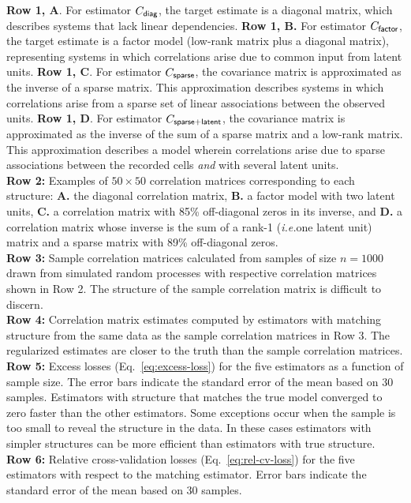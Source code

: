 \documentclass[10pt]{article}
\newcommand{\ie}{\emph{i.e.}\;}
\begin{document}
\begin{FPfigure}
{        {\bf Row 1, A}.  For estimator $C_{\sf diag}$, the target estimate is a diagonal matrix, which describes systems that lack linear dependencies. 
        {\bf  Row 1, B.} For estimator $C_{\sf factor}$, the target estimate is a factor model (low-rank matrix plus a diagonal matrix), representing systems in which correlations arise due to common input from latent units. 
        {\bf  Row 1, C}. For estimator $C_{\sf sparse}$, the covariance matrix is approximated as the inverse of a sparse matrix. This approximation describes systems in which correlations arise from a sparse set of  linear associations between the observed units. 
        {\bf  Row 1, D}.  For estimator $C_{\sf sparse+latent}$, the covariance matrix is approximated as the inverse of the sum of a sparse matrix and a low-rank matrix. This approximation describes a model wherein correlations arise due to sparse associations between the recorded cells \emph{and} with several latent units. \\
{\bf Row 2:} Examples of $50\times 50$ correlation matrices corresponding to each structure: {\bf A.} the diagonal correlation matrix, {\bf B.} a factor model with two latent units, {\bf C.}  a correlation matrix with 85\%  off-diagonal zeros in its inverse, and {\bf  D.} a correlation matrix whose inverse is the sum of a rank-1 (\ie one latent unit) matrix and a sparse matrix with 89\% off-diagonal zeros. 
\\
{\bf Row 3:} Sample correlation matrices calculated from samples of size $n=1000$ drawn from simulated random processes with respective correlation matrices shown in Row 2.  The structure of the sample correlation matrix is difficult to discern.
\\
{\bf Row 4:} Correlation matrix estimates computed by estimators with matching structure from the same data as the sample correlation matrices in Row 3. The regularized estimates are closer to the truth than the sample correlation matrices.
\\
{\bf Row 5:} Excess losses (Eq.~\ref{eq:excess-loss}) for the five estimators as a function of sample size. The error bars indicate the standard error of the mean based on 30 samples.  Estimators with structure that matches the true model converged to zero faster than the other estimators. Some exceptions occur when the sample is too small to reveal the structure in the data. In these cases estimators with simpler structures can be more efficient than estimators with true structure.
\\
{\bf Row 6:} Relative cross-validation losses (Eq.~\ref{eq:rel-cv-loss}) for the five estimators with respect to the matching estimator. Error bars indicate the standard error of the mean based on 30 samples.
    }
    \label{fig:02}
\end{FPfigure} 
\end{document}
